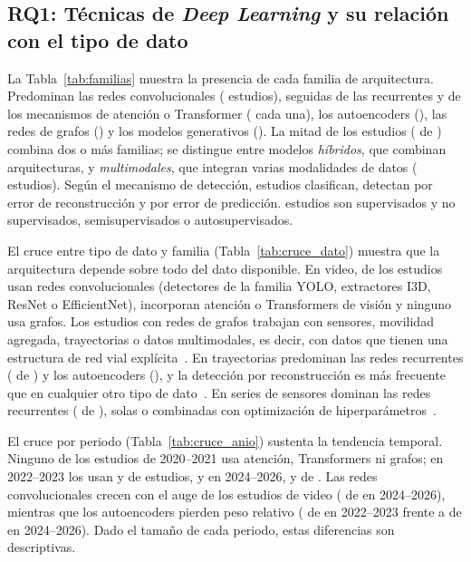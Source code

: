\documentclass[12pt, a4paper]{article}
\begin{document}
\subsection{RQ1: Técnicas de \textit{Deep Learning} y su relación con el tipo de dato}

La Tabla~\ref{tab:familias} muestra la presencia de cada familia de arquitectura. Predominan las redes convolucionales (\NfamConv{} estudios), seguidas de las recurrentes y de los mecanismos de atención o Transformer (\NfamRec{} cada una), los autoencoders (\NfamAE), las redes de grafos (\NfamGrafo) y los modelos generativos (\NfamGen). La mitad de los estudios (\Nhibrido{} de \Nestudios) combina dos o más familias; se distingue entre modelos \textit{híbridos}, que combinan arquitecturas, y \textit{multimodales}, que integran varias modalidades de datos (\Nmultimodal{} estudios). Según el mecanismo de detección, \NenfoqueClasif{} estudios clasifican, \NenfoqueRecon{} detectan por error de reconstrucción y \NenfoquePred{} por error de predicción. \Nsupervisado{} estudios son supervisados y \Nnosupervisado{} no supervisados, semisupervisados o autosupervisados.



El cruce entre tipo de dato y familia (Tabla~\ref{tab:cruce_dato}) muestra que la arquitectura depende sobre todo del dato disponible. En video, \XVideoConv{} de los \NdatoVideo{} estudios usan redes convolucionales (detectores de la familia YOLO, extractores I3D, ResNet o EfficientNet), \XVideoTransf{} incorporan atención o Transformers de visión y ninguno usa grafos. Los \NfamGrafo{} estudios con redes de grafos trabajan con sensores, movilidad agregada, trayectorias o datos multimodales, es decir, con datos que tienen una estructura de red vial explícita~\cite{zhang2022automatic,ren2024graph,park2025graph,duan2025multimodal,nouri2026early}. En trayectorias predominan las redes recurrentes (\XTrayectoriasRec{} de \NdatoTrayectorias) y los autoencoders (\XTrayectoriasAE), y la detección por reconstrucción es más frecuente que en cualquier otro tipo de dato~\cite{zhang2023trajectory,li2023retad,wang2024multiscale,chakraborty2023structural}. En series de sensores dominan las redes recurrentes (\XSensoresRec{} de \NdatoSensores), solas o combinadas con optimización de hiperparámetros~\cite{shang2021hybrid,gu2025irf}.



El cruce por periodo (Tabla~\ref{tab:cruce_anio}) sustenta la tendencia temporal. Ninguno de los \NperiodoAntes{} estudios de 2020--2021 usa atención, Transformers ni grafos; en 2022--2023 los usan \XMedioTransf{} y \XMedioGrafo{} de \NperiodoMedio{} estudios, y en 2024--2026, \XRecienteTransf{} y \XRecienteGrafo{} de \NperiodoReciente. Las redes convolucionales crecen con el auge de los estudios de video (\XRecienteConv{} de \NperiodoReciente{} en 2024--2026), mientras que los autoencoders pierden peso relativo (\XMedioAE{} de \NperiodoMedio{} en 2022--2023 frente a \XRecienteAE{} de \NperiodoReciente{} en 2024--2026). Dado el tamaño de cada periodo, estas diferencias son descriptivas.
\end{document}
